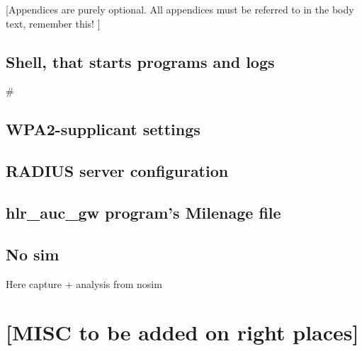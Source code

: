 \documentclass[12pt,a4paper,english]{tutthesis}
\begin{document}
\begin{otherlanguage}{english}
\markboth{\appA}{\appA}                %

[Appendices are purely optional.  All appendices must be referred to in
the body text, remember this! ]

\section{Shell, that starts programs and logs}
\label{sec-7-1}
\label{app:fulleap}
# %
\scriptsize

\normalsize



\section{WPA2-supplicant settings}
\label{sec-7-2}
\label{app:wpa-conf}
\scriptsize

\normalsize

\section{RADIUS server configuration}
\label{sec-7-3}
\label{app:radius-conf}
\scriptsize

\normalsize
\section{hlr\_auc\_gw program's Milenage file}
\label{sec-7-4}

\label{app:hlraucgw}
\scriptsize

\normalsize

\section{No sim}
\label{sec-7-5}
\label{app:nosim}

Here capture + analysis from nosim

\chapter{[MISC to be added on right places]}
\label{sec-8}

\end{otherlanguage}
\end{document}
